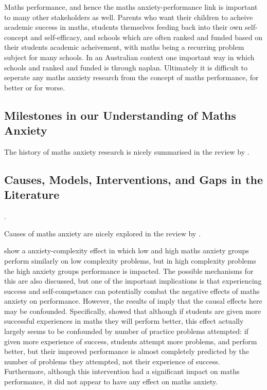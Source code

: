\documentclass[14pt]{memoir}
\begin{document}
Maths performance, and hence the maths anxiety-performance link is important to many other stakeholders as well. Parents who want their children to acheive academic success in maths, students themselves feeding back into their own self-concept and self-efficacy, and schools which are often ranked and funded based on their students academic acheivement, with maths being a recurring problem subject for many schools. In an Australian context one important way in which schools and ranked and funded is through \gls{naplan}. Ultimately it is difficult to seperate any maths anxiety research from the concept of maths performance, for better or for worse.

\subsection*{Milestones in our Understanding of Maths Anxiety}
The history of maths anxiety research is nicely summarised in the review by \cite{Pellicioni2016}.


\subsection*{Causes, Models, Interventions, and Gaps in the Literature}.

Causes of maths anxiety are nicely explored in the review by \cite{Ramirez2018}.


\cite{Faust1996} show a anxiety-complexity effect in which low and high maths anxiety groups perform similarly on low complexity problems, but in high complexity problems the high anxiety groups performance is impacted. The possible mechanisms for this are also discussed, but one of the important implications is that experiencing success and self-competance can potentially combat the negative effects of maths anxiety on performance. However, the results of \cite{Jansen2013} imply that the causal effects here may be confounded. Specifically, \cite{Jansen2013} showed that although if students are given more successful experiences in maths they will perform better, this effect actually largely seems to be confounded by number of practice problems attempted: if given more experience of success, students attempt more problems, and perform better, but their improved performance is almost completely predicted by the number of problems they attempted, not their experience of success. Furthermore, although this intervention had a significant impact on maths performance, it did not appear to have any effect on maths anxiety. 
\end{document}
